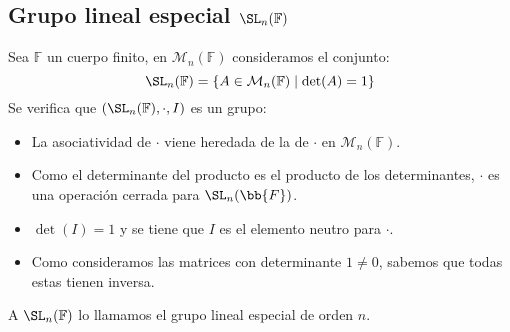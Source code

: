 \subsection{Grupo lineal especial $\SL_n(\mathbb{F})$}
\begin{definicion} Sea $\mathbb{F}$ un cuerpo finito, en $\mathcal{M}_n(\mathbb{F})$ consideramos el conjunto:
    \begin{equation*}
        \SL_n(\mathbb{F}) = \{A\in \mathcal{M}_n(\mathbb{F}) \mid \det(A)=1\}
    \end{equation*}
    Se verifica que $(\SL_n(\mathbb{F}),\cdot,I)$ es un grupo:
    \begin{itemize}
        \item La asociatividad de $\cdot $ viene heredada de la de $\cdot $ en $\mathcal{M}_n(\mathbb{F})$.
        \item Como el determinante del producto es el producto de los determinantes, $\cdot $ es una operación cerrada para $\SL_n(\bb{F})$.
        \item $\det(I)=1$ y se tiene que $I$ es el elemento neutro para $\cdot $.
        \item Como consideramos las matrices con determinante $1\neq 0$, sabemos que todas estas tienen inversa.
    \end{itemize}
    A $\SL_n(\mathbb{F})$ lo llamamos el grupo lineal especial de orden $n$.
\end{definicion}

